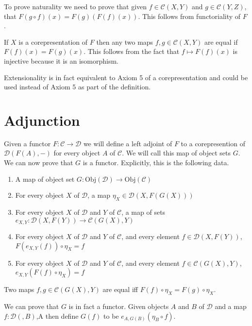 \documentclass[12pt]{article} %
\theoremstyle{definition}
\theoremstyle{definition}
\theoremstyle{definition}
\theoremstyle{definition}
\begin{document}
To prove naturality we need to prove that given $f \in \mathcal{C}(X, Y)$ and $g \in \mathcal{C}(Y, Z)$,
that $F(g \circ f)(x) = F(g)(F(f)(x))$. This follows from functoriality of $F$.

If $X$ is a corepresentation of $F$ then any two maps $f, g \in \mathcal{C}(X, Y)$ are equal
if $F(f)(x) = F(g)(x)$. This follows from the fact that $f \mapsto F(f)(x)$ is injective
because it is an isomorphism.

Extensionality is in fact equivalent to Axiom 5 of a corepresentation and could be used
instead of Axiom 5 as part of the definition.

\section{Adjunction}

Given a functor $F : \mathcal{C} \to \mathcal{D}$ we will define a left adjoint of $F$ to 
a corepresention of $\mathcal{D}(F(A),-)$ for every object $A$ of $\mathcal{C}$. We will call
this map of object sets $G$. We can now prove that $G$ is a functor. Explicitly,
this is the following data.

\begin{enumerate}
  \item A map of object set $G : \text{Obj}(\mathcal{D})\to \text{Obj}(\mathcal{C})$
  \item For every object $X$ of $\mathcal{D}$, a map $\eta_X \in \mathcal{D}(X, F(G(X)))$
  \item For every object $X$ of $\mathcal{D}$ and $Y$ of $\mathcal{C}$, 
    a map of sets $e_{X,Y} : \mathcal{D}(X, F(Y)) \to \mathcal{C}(G(X), Y)$
  \item For every object $X$ of $\mathcal{D}$ and $Y$ of $\mathcal{C}$, 
    and every element $f \in \mathcal{D}(X, F(Y))$, $F(e_{X,Y}(f)) \circ \eta_X = f$
  \item For every object $X$ of $\mathcal{D}$ and $Y$ of $\mathcal{C}$, 
  and every element $f \in \mathcal{C}(G(X), Y)$, $e_{X,Y}(F(f) \circ \eta_X) = f$
\end{enumerate}


Two maps $f,g \in \mathcal{C}(G(X), Y)$ are equal iff $F(f) \circ \eta_X = F(g) \circ \eta_X$.

We can prove that $G$ is in fact a functor. 
Given objects $A$ and $B$ of $\mathcal{D}$ and a map $f : \mathcal{D}(, B)$,A
then define $G(f)$ to be $e_{A,G(B)}(\eta_B \circ f)$.
\end{document}
